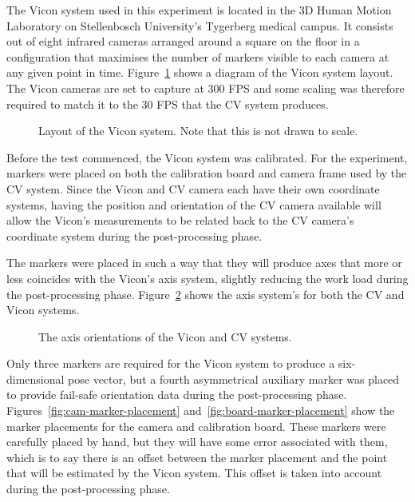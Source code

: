 The Vicon system used in this experiment is located in the 3D Human Motion Laboratory on Stellenbosch University's Tygerberg medical campus. It consists out of eight  infrared cameras arranged around a square on the floor in a configuration that maximises the number of markers visible to each camera at any given point in time. Figure~\ref{fig:vicon-layout} shows a diagram of the Vicon system layout. The Vicon cameras are set to capture at 300 FPS and some scaling was therefore required to match it to the 30 FPS that the CV system produces. 
 
\begin{figure}
  \centering
  \def\svgwidth{0.6\textwidth}
  
  \caption{Layout of the Vicon system. Note that this is not drawn to scale.}
\label{fig:vicon-layout}
\end{figure}

Before the test commenced, the Vicon system was calibrated. For the experiment, markers were placed on both the calibration board and camera frame used by the CV system. Since the Vicon and CV camera each have their own coordinate systems, having the position and orientation of the CV camera available will allow the Vicon's measurements to be related back to the CV camera's coordinate system during the post-processing phase. 

The markers were placed in such a way that they will produce axes that more or less coincides with the Vicon's axis system, slightly reducing the work load during the post-processing phase. Figure~\ref{fig:cam-vicon-axes} shows the axis system's for both the CV and Vicon systems.

\begin{figure}
  \centering
  \def\svgwidth{0.6\textwidth}
  
  \caption{The axis orientations of the Vicon and CV systems.}
\label{fig:cam-vicon-axes}
\end{figure}

Only three markers are required for the Vicon system to produce a six-dimensional pose vector, but a fourth asymmetrical auxiliary marker was placed to provide fail-safe orientation data during the post-processing phase. Figures~\ref{fig:cam-marker-placement} and~\ref{fig:board-marker-placement} show the marker placements for the camera and calibration board. These markers were carefully placed by hand, but they will have some error associated with them, which is to say there is an offset between the marker placement and the point that will be estimated by the Vicon system. This offset is taken into account during the post-processing phase.

